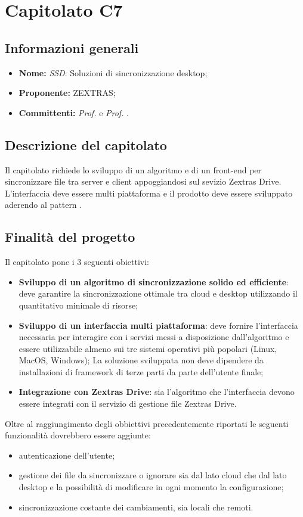 \section{Capitolato C7}

\subsection{Informazioni generali}
\begin{itemize}
\item \textbf{Nome:} \textit{SSD}: Soluzioni di sincronizzazione desktop;
\item \textbf{Proponente:} ZEXTRAS;
\item \textbf{Committenti:} \textit{Prof. \Tullio{}} e \textit{Prof. \Riccardo{}}.
\end{itemize}

\subsection{Descrizione del capitolato}
Il capitolato richiede lo sviluppo di un algoritmo e di un front-end per sincronizzare file tra server e client appoggiandosi sul sevizio Zextras Drive.
L'interfaccia deve essere multi piattaforma e il prodotto deve essere sviluppato aderendo al pattern .

\subsection{Finalità del progetto}
Il capitolato pone i 3 seguenti obiettivi:
\begin{itemize}
\item \textbf{Sviluppo di un algoritmo di sincronizzazione solido ed efficiente}: deve garantire la sincronizzazione ottimale tra cloud e desktop utilizzando il quantitativo minimale di risorse;
\item \textbf{Sviluppo di un interfaccia multi piattaforma}: deve fornire l'interfaccia necessaria per interagire con i servizi messi a disposizione 
dall'algoritmo e essere utilizzabile almeno sui tre sistemi operativi più popolari (Linux, MacOS, Windows);
La soluzione sviluppata non deve dipendere da installazioni di framework di terze parti da parte dell'utente finale;
\item \textbf{Integrazione con Zextras Drive}: sia l'algoritmo che l'interfaccia devono essere integrati con il servizio di gestione file Zextras Drive.
\end{itemize}
Oltre al raggiungimento degli obbiettivi precedentemente riportati le seguenti funzionalità dovrebbero essere aggiunte:
\begin{itemize}
\item autenticazione dell'utente;
\item gestione dei file da sincronizzare o ignorare sia dal lato cloud che dal lato desktop e la possibilità di modificare in ogni momento la configurazione;
\item sincronizzazione costante dei cambiamenti, sia locali che remoti.
\end{itemize}

